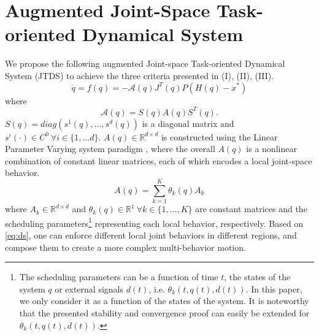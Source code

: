 \documentclass[letterpaper, 10 pt, conference,fleqn]{ieeeconf}
\begin{document}
\section{Augmented \textbf{J}oint-Space \textbf{T}ask-oriented \textbf{D}ynamical \textbf{S}ystem} \label{Sec:DS}
\label{sec:proposed_system}
We propose the following augmented Joint-space Task-oriented Dynamical System (JTDS) to achieve the three criteria presented in (I), (II), (III).
\begin{equation}
\label{eq:ds}
\dot{q} = f(q) = -\mathcal{A}(q)J^T(q)P(H(q) - x^*)
\end{equation}
where 
\begin{equation}
\label{eq:SAS}
\mathcal{A}(q) = S(q) A(q) S^T(q). 
\end{equation}
$S(q)=diag(s^1(q),\dots,s^d(q))$ is a diagonal matrix and $ s^i(\cdot)\in C^0~\forall i \in \{1,\dots d\} $. $A(q)\in \mathbb{R}^{d\times d}$ is constructed using the Linear Parameter Varying system paradigm \cite{emedi2016fixed,7439839}, where the overall $A(q)$ is a nonlinear combination of constant linear matrices, each of which encodes a local joint-space behavior. 
\begin{equation}
\label{eq:A_def}
A(q) = \sum_{k=1}^{K}\theta_k(q)A_k 
\end{equation}
where $A_k\in \mathbb{R}^{d\times d} $ and $\theta_k(q)\in \mathbb{R}^{1}~\forall k\in\{1,\dots,K\} $ are constant matrices and the scheduling parameters\footnote{The scheduling parameters can be a function of time $t$, the states of the
system $q $ or external signals $d(t)$, i.e. $\theta_k (t, q(t), d(t))$. In this paper, we only consider it as a function of the states of the system. It is noteworthy that the presented stability and convergence proof can easily be extended for $\theta_k (t, q(t), d(t))$.} representing each local behavior, respectively. Based on \eqref{eq:ds}, one can enforce different local joint behaviors in different regions, and compose them to create a more complex multi-behavior motion.
\end{document}
